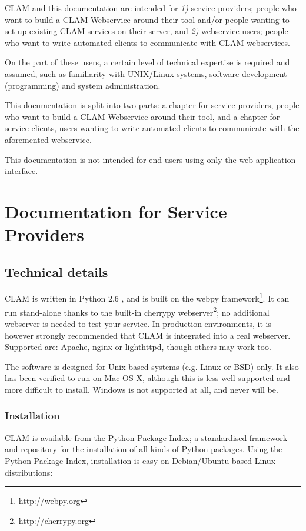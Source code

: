 \documentclass[a4paper,12pt]{report}
\begin{document}
CLAM and this documentation are intended for \emph{1)} service providers;
people who want to build a CLAM Webservice around their tool and/or people
wanting to set up existing CLAM services on their server, and \emph{2)}
webservice users; people who want to write automated clients to communicate
with CLAM webservices. 

On the part of these users, a certain level of technical expertise is required
and assumed, such as familiarity with UNIX/Linux systems, software development
(programming) and system administration.  

This documentation is split into two parts: a chapter for service providers,
people who want to build a CLAM Webservice around their tool, and a chapter for
service clients, users wanting to write automated clients to communicate with
the aforemented webservice.

This documentation is not intended for end-users using only the web application
interface. 

\chapter{Documentation for Service Providers}

\section{Technical details}

CLAM is written in Python 2.6 \citep{PYTHON}, and is built on the webpy
framework\footnote{http://webpy.org}. It can run
stand-alone thanks to the built-in cherrypy
webserver\footnote{http://cherrypy.org}; no additional webserver
is needed to test your service. In production environments, it is however
strongly recommended that CLAM is integrated into a real webserver. Supported
are: Apache, nginx or lighthttpd, though others may work too.

The software is designed for Unix-based systems (e.g. Linux or BSD) only. It
also has been verified to run on Mac OS X, although this is less well supported
and more difficult to install. Windows is not supported at all, and never will
be.

\subsection{Installation}

CLAM is available from the Python Package Index; a standardised framework and
repository for the installation of all kinds of Python packages. Using the
Python Package Index, installation is easy on Debian/Ubuntu based Linux
distributions:
\end{document}
